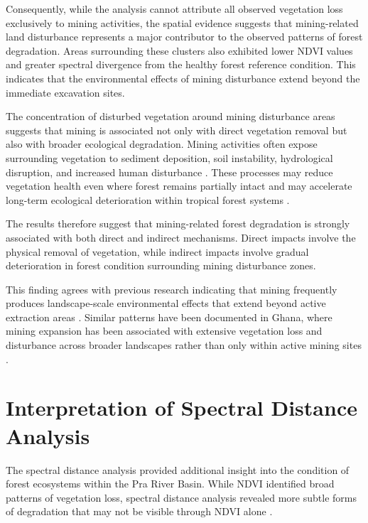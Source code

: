\documentclass[a4paper,12pt]{report}
\begin{document}
Consequently, while the analysis cannot attribute all observed vegetation loss exclusively to mining activities, the spatial evidence suggests that mining-related land disturbance represents a major contributor to the observed patterns of forest degradation. Areas surrounding these clusters also exhibited lower NDVI values and greater spectral divergence from the healthy forest reference condition. This indicates that the environmental effects of mining disturbance extend beyond the immediate excavation sites.

The concentration of disturbed vegetation around mining disturbance areas suggests that mining is associated not only with direct vegetation removal but also with broader ecological degradation. Mining activities often expose surrounding vegetation to sediment deposition, soil instability, hydrological disruption, and increased human disturbance \citep{hilson2002environmental,sonter2017mining}. These processes may reduce vegetation health even where forest remains partially intact and may accelerate long-term ecological deterioration within tropical forest systems \citep{tarazona2020monitoring}.

The results therefore suggest that mining-related forest degradation is strongly associated with both direct and indirect mechanisms. Direct impacts involve the physical removal of vegetation, while indirect impacts involve gradual deterioration in forest condition surrounding mining disturbance zones.

This finding agrees with previous research indicating that mining frequently produces landscape-scale environmental effects that extend beyond active extraction areas \citep{hilson2002land,sonter2017mining}. Similar patterns have been documented in Ghana, where mining expansion has been associated with extensive vegetation loss and disturbance across broader landscapes rather than only within active mining sites \citep{barenblitt2021ghana,awotwi2018pra}.

\section{Interpretation of Spectral Distance Analysis}

The spectral distance analysis provided additional insight into the condition of forest ecosystems within the Pra River Basin. While NDVI identified broad patterns of vegetation loss, spectral distance analysis revealed more subtle forms of degradation that may not be visible through NDVI alone \citep{richards2013remote,pettorelli2011ndvi_limits}.
\end{document}
